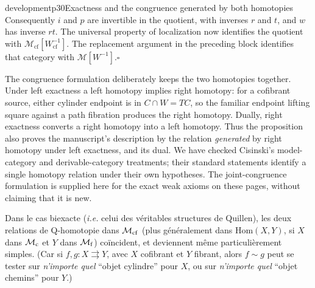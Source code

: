 \begin{dcomment}{development}{p30}{Exactness and the congruence generated by both homotopies}
Consequently $i$ and $p$ are invertible in the quotient, with inverses $r$ and $t$, and $w$ has inverse $rt$. The universal property of localization now identifies the quotient with $\mathcal M_{\mathrm{cf}}[W_{\mathrm{cf}}^{-1}]$. The replacement argument in the preceding block identifies that category with $\mathcal M[W^{-1}]$.\hfill$\square$

The congruence formulation deliberately keeps the two homotopies together. Under left exactness a left homotopy implies right homotopy: for a cofibrant source, either cylinder endpoint is in $C\cap W=TC$, so the familiar endpoint lifting square against a path fibration produces the right homotopy. Dually, right exactness converts a right homotopy into a left homotopy. Thus the proposition also proves the manuscript's description by the relation \emph{generated} by right homotopy under left exactness, and its dual. We have checked Cisinski's model-category and derivable-category treatments; their standard statements identify a single homotopy relation under their own hypotheses. The joint-congruence formulation is supplied here for the exact weak axioms on these pages, without claiming that it is new.
\end{dcomment}


Dans le cas biexacte (\textit{i.e.} celui des véritables structures de Quillen), les deux relations de Q-homotopie dans $\mathcal{M}_{\mathrm{cf}}$ (plus généralement dans $\mathrm{Hom}(X,Y)$, si $X$ dans $\mathcal{M}_{\mathrm{c}}$ et $Y$ dans $\mathcal{M}_{\mathrm{f}}$)
coïncident, et deviennent même particulièrement simples. (Car si $f, g : X \rightrightarrows Y$, avec $X$ cofibrant et $Y$ fibrant, alors $f\sim g$ peut se tester sur \textit{n'importe quel} “objet cylindre” pour $X$, ou sur \textit{n'importe quel} “objet chemins” pour $Y$.)

